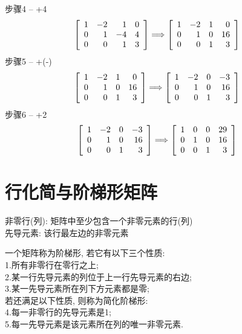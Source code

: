 步骤4 -- +4
\[\left[\begin{array}{r r r r}
    1 & -2 & 1 & 0\\
    0 & 1 & -4 & 4\\
    0 & 0 & 1 & 3
\end{array}\right] \Longrightarrow \left[\begin{array}{r r r r}
	1 & -2 & 1 & 0\\
	0 & 1 & 0 & 16\\
	0 & 0 & 1 & 3
\end{array}\right]\]
步骤5 -- +(-)
\[\left[\begin{array}{r r r r}
    1 & -2 & 1 & 0\\
    0 & 1 & 0 & 16\\
    0 & 0 & 1 & 3
\end{array}\right] \Longrightarrow \left[\begin{array}{r r r r}
	1 & -2 & 0 & -3\\
	0 & 1 & 0 & 16\\
	0 & 0 & 1 & 3
\end{array}\right]\]
步骤6 -- +2
\[\left[\begin{array}{r r r r}
    1 & -2 & 0 & -3\\
    0 & 1 & 0 & 16\\
    0 & 0 & 1 & 3
\end{array}\right] \Longrightarrow \left[\begin{array}{r r r r}
	1 & 0 & 0 & 29\\
	0 & 1 & 0 & 16\\
	0 & 0 & 1 & 3
\end{array}\right]\]
\vspace{6ex}

\section{行化简与阶梯形矩阵}
非零行(列): 矩阵中至少包含一个非零元素的行(列)\\
先导元素: 该行最左边的非零元素\\
\begin{definition}
一个矩阵称为阶梯形, 若它有以下三个性质:\\
1.所有非零行在零行之上;\\
2.某一行先导元素的列位于上一行先导元素的右边;\\
3.某一先导元素所在列下方元素都是零;\\
若还满足以下性质, 则称为简化阶梯形:\\
4.每一非零行的先导元素是1;\\
5.每一先导元素是该元素所在列的唯一非零元素.
\end{definition}\vspace{2ex}

